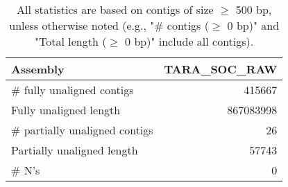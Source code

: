 \documentclass[12pt,a4paper]{article}
\begin{document}
\begin{table}[ht]
\begin{center}
\caption{All statistics are based on contigs of size $\geq$ 500 bp, unless otherwise noted (e.g., "\# contigs ($\geq$ 0 bp)" and "Total length ($\geq$ 0 bp)" include all contigs).}
\begin{tabular}{|l*{1}{|r}|}
\hline
Assembly & TARA\_SOC\_RAW \\ \hline
\# fully unaligned contigs & 415667 \\ \hline
Fully unaligned length & 867083998 \\ \hline
\# partially unaligned contigs & 26 \\ \hline
Partially unaligned length & 57743 \\ \hline
\# N's & 0 \\ \hline
\end{tabular}
\end{center}
\end{table}
\end{document}
